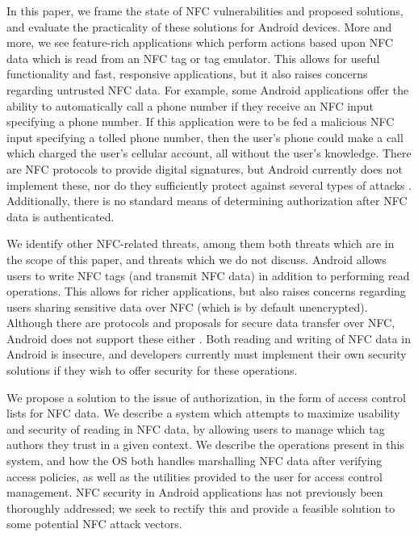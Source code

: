 \documentclass[12pt]{article}
\begin{document}
In this paper, we frame the state of NFC vulnerabilities and proposed solutions, and evaluate the practicality of these solutions for Android devices.
More and more, we see feature-rich applications which perform actions based upon NFC data which is read from an NFC tag or tag emulator.
This allows for useful functionality and fast, responsive applications, but it also raises concerns regarding untrusted NFC data.
For example, some Android applications offer the ability to automatically call a phone number if they receive an NFC input specifying a phone number.
If this application were to be fed a malicious NFC input specifying a tolled phone number, then the user's phone could make a call which charged the user's cellular account, all without the user's knowledge.
There are NFC protocols to provide digital signatures, but Android currently does not implement these, nor do they sufficiently protect against several types of attacks \cite{roland2011, nfcsignaturertd}.
Additionally, there is no standard means of determining authorization after NFC data is authenticated.

We identify other NFC-related threats, among them both threats which are in the scope of this paper, and threats which we do not discuss.
Android allows users to write NFC tags (and transmit NFC data) in addition to performing read operations.
This allows for richer applications, but also raises concerns regarding users sharing sensitive data over NFC (which is by default unencrypted).
Although there are protocols and proposals for secure data transfer over NFC, Android does not support these either \cite{nfcsignaturertd, nfcsec01}.
Both reading and writing of NFC data in Android is insecure, and developers currently must implement their own security solutions if they wish to offer security for these operations.

We propose a solution to the issue of authorization, in the form of access control lists for NFC data.
We describe a system which attempts to maximize usability and security of reading in NFC data, by allowing users to manage which tag authors they trust in a given context.
We describe the operations present in this system, and how the OS both handles marshalling NFC data after verifying access policies, as well as the utilities provided to the user for access control management.
NFC security in Android applications has not previously been thoroughly addressed; we seek to rectify this and provide a feasible solution to some potential NFC attack vectors.
\end{document}
